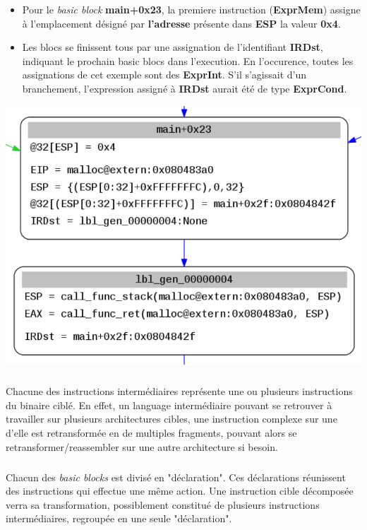\begin{itemize}
    \item Pour le \textit{basic block} \textbf{main+0x23}, la premiere instruction (\textbf{ExprMem}) assigne à l'emplacement désigné par \textbf{l'adresse}
        présente dans \textbf{ESP} la valeur \textbf{0x4}.
    \item Les blocs se finissent tous par une assignation de l'identifiant \textbf{IRDst}, indiquant le prochain basic blocs dans l'execution.
        En l'occurence, toutes les assignations de cet exemple sont des \textbf{ExprInt}. S'il s'agissait d'un branchement, l'expression assigné à \textbf{IRDst}
        aurait été de type \textbf{ExprCond}.
\end{itemize}
\begin{center}
\includegraphics[scale=0.3]{ir.png}\newline
\end{center}
\subparagraph{}
Chacune des instructions intermédiaires représente une ou plusieurs instructions du binaire ciblé. En effet, un language intermédiaire
pouvant se retrouver à travailler sur plusieurs architectures cibles, une instruction complexe sur une d'elle est retransformée en de multiples
fragments, pouvant alors se retransformer/reassembler sur une autre architecture si besoin.
\subparagraph{}
Chacun des \textit{basic blocks} est divisé en "déclaration". Ces déclarations réunissent des instructions qui effectue une même action. Une instruction cible décomposée
verra sa transformation, possiblement constitué de plusieurs instructions intermédiaires, regroupée en une seule "déclaration".



